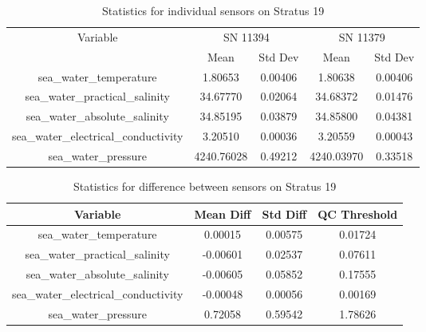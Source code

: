 \begin{table}[h]
\centering
\begin{tabular}{|c|c|c|c|c|}
\hline
Variable & \multicolumn{2}{c|}{SN 11394} & \multicolumn{2}{c|}{SN 11379} \\
& Mean & Std Dev & Mean & Std Dev \\
\hline
sea\_water\_temperature & 1.80653 & 0.00406 & 1.80638 & 0.00406 \\
sea\_water\_practical\_salinity & 34.67770 & 0.02064 & 34.68372 & 0.01476 \\
sea\_water\_absolute\_salinity & 34.85195 & 0.03879 & 34.85800 & 0.04381 \\
sea\_water\_electrical\_conductivity & 3.20510 & 0.00036 & 3.20559 & 0.00043 \\
sea\_water\_pressure & 4240.76028 & 0.49212 & 4240.03970 & 0.33518 \\
\hline
\end{tabular}
\caption{Statistics for individual sensors on Stratus 19}
\end{table}

\begin{table}[h]
\centering
\begin{tabular}{|c|c|c|c|}
\hline
Variable & Mean Diff & Std Diff & QC Threshold \\
\hline
sea\_water\_temperature & 0.00015 & 0.00575 & 0.01724 \\
sea\_water\_practical\_salinity & -0.00601 & 0.02537 & 0.07611 \\
sea\_water\_absolute\_salinity & -0.00605 & 0.05852 & 0.17555 \\
sea\_water\_electrical\_conductivity & -0.00048 & 0.00056 & 0.00169 \\
sea\_water\_pressure & 0.72058 & 0.59542 & 1.78626 \\
\hline
\end{tabular}
\caption{Statistics for difference between sensors on Stratus 19}
\end{table}
